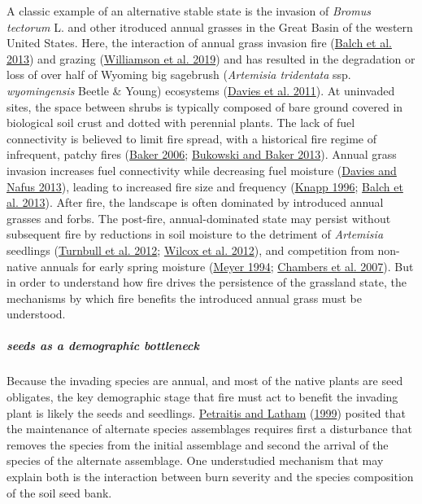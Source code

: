 \documentclass[
  12pt,
]{article}
\begin{document}
A classic example of an alternative stable state is the invasion of
\emph{Bromus tectorum} L. and other itroduced annual grasses in the
Great Basin of the western United States. Here, the interaction of
annual grass invasion fire (\protect\hyperlink{ref-Balch2013}{Balch et
al. 2013}) and grazing
(\protect\hyperlink{ref-Williamson2019}{Williamson et al. 2019}) and has
resulted in the degradation or loss of over half of Wyoming big
sagebrush (\emph{Artemisia tridentata} ssp. \emph{wyomingensis} Beetle
\& Young) ecosystems (\protect\hyperlink{ref-Davies2011}{Davies et al.
2011}). At uninvaded sites, the space between shrubs is typically
composed of bare ground covered in biological soil crust and dotted with
perennial plants. The lack of fuel connectivity is believed to limit
fire spread, with a historical fire regime of infrequent, patchy fires
(\protect\hyperlink{ref-Baker2006}{Baker 2006};
\protect\hyperlink{ref-Bukowski2013}{Bukowski and Baker 2013}). Annual
grass invasion increases fuel connectivity while decreasing fuel
moisture (\protect\hyperlink{ref-Davies2013}{Davies and Nafus 2013}),
leading to increased fire size and frequency
(\protect\hyperlink{ref-Knapp1996}{Knapp 1996};
\protect\hyperlink{ref-Balch2013}{Balch et al. 2013}). After fire, the
landscape is often dominated by introduced annual grasses and forbs. The
post-fire, annual-dominated state may persist without subsequent fire by
reductions in soil moisture to the detriment of \emph{Artemisia}
seedlings (\protect\hyperlink{ref-Turnbull2012}{Turnbull et al. 2012};
\protect\hyperlink{ref-Wilcox2012}{Wilcox et al. 2012}), and competition
from non-native annuals for early spring moisture
(\protect\hyperlink{ref-Meyer1994}{Meyer 1994};
\protect\hyperlink{ref-Chambers2007}{Chambers et al. 2007}). But in
order to understand how fire drives the persistence of the grassland
state, the mechanisms by which fire benefits the introduced annual grass
must be understood.

\hypertarget{seeds-as-a-demographic-bottleneck}{%
\subparagraph{seeds as a demographic
bottleneck}\label{seeds-as-a-demographic-bottleneck}}

Because the invading species are annual, and most of the native plants
are seed obligates, the key demographic stage that fire must act to
benefit the invading plant is likely the seeds and seedlings.
\protect\hyperlink{ref-Petraitis1999}{Petraitis and Latham}
(\protect\hyperlink{ref-Petraitis1999}{1999}) posited that the
maintenance of alternate species assemblages requires first a
disturbance that removes the species from the initial assemblage and
second the arrival of the species of the alternate assemblage. One
understudied mechanism that may explain both is the interaction between
burn severity and the species composition of the soil seed bank.
\end{document}
